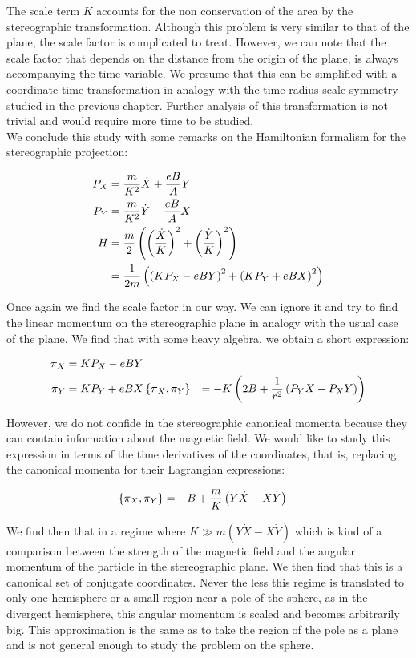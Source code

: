The scale term $K$ accounts for the non conservation of the area by the stereographic transformation. Although this problem is very similar to that of the plane, the scale factor is complicated to treat. However, we can note that the scale factor that depends on the distance from the origin of the plane, is always accompanying the time variable. We presume that this can be simplified with a coordinate time transformation in analogy with the time-radius scale symmetry studied in the previous chapter. Further analysis of this transformation is not trivial and would require more time to be studied.\\

We conclude this study with some remarks on the Hamiltonian formalism for the stereographic projection:

\begin{align*}
P_X &= \frac{m}{K^2}\dot{X} + \frac{eB}{A}Y\\
P_Y &= \frac{m}{K^2}\dot{Y} - \frac{eB}{A}X\\
H &= \frac{m}{2}\left( \left( \frac{\dot{X}}{K} \right)^2+\left( \frac{\dot{Y}}{K} \right)^2 \right)\\
&= \frac{1}{2m}\left( \left( KP_X-eBY \right)^2+\left( KP_Y+eBX \right)^2 \right)
\end{align*}

Once again we find the scale factor in our way. We can ignore it and try to find the linear momentum on the stereographic plane in analogy with the usual case of the plane. We find that with some heavy algebra, we obtain a short expression:

\begin{align*}
\pi_X &= KP_X-eBY\\
\pi_Y &= KP_Y+eBX
\left\lbrace \pi_X, \pi_Y \right\rbrace &= -K\left( 2B + \frac{1}{r^2}\left( P_YX-P_XY \right) \right) 
\end{align*}

However, we do not confide in the stereographic canonical momenta because they can contain information about the magnetic field. We would like to study this expression in terms of the time derivatives of the coordinates, that is, replacing the canonical momenta for their Lagrangian expressions:

\begin{align*}
\left\lbrace \pi_X, \pi_Y \right\rbrace &= -B + \frac{m}{K}\left( Y\dot{X}-X\dot{Y} \right)
\end{align*}

We find then that in a regime where $K \gg  m(Y\dot{X}-X\dot{Y})$ which is kind of a comparison between the strength of the magnetic field and the angular momentum of the particle in the stereographic plane. We then find that this is a canonical set of conjugate coordinates. Never the less this regime is translated to only one hemisphere or a small region near a pole of the sphere, as in the divergent hemisphere, this angular momentum is scaled and becomes arbitrarily big. This approximation is the same as to take the region of the pole as a plane and is not general enough to study the problem on the sphere.\\

